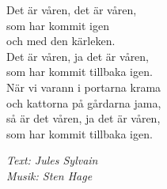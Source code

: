 \vspace{10pt}
Det är våren, det är våren,\\
som har kommit igen\\
och med den kärleken.\\
Det är våren, ja det är våren,\\
som har kommit tillbaka igen.\\
När vi varann i portarna krama\\
och kattorna på gårdarna jama,\\
så är det våren, ja det är våren,\\
som har kommit tillbaka igen.\par
\vspace{10pt}
{\footnotesize\textit{Text: Jules Sylvain\\ Musik: Sten Hage}}
